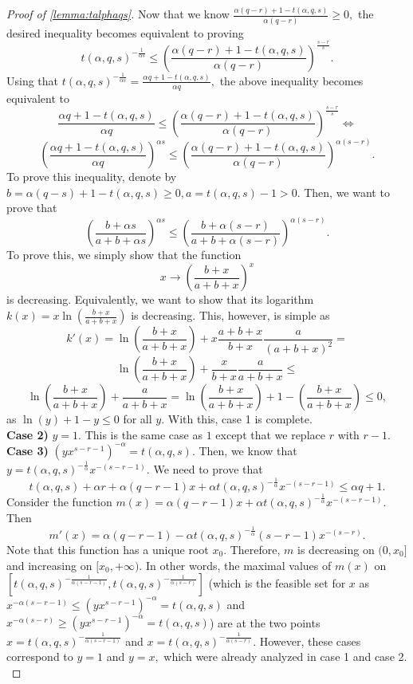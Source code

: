 \documentclass[11pt]{article}%
\numberwithin{theorem}{subsection}
\begin{document}
\begin{proof}[Proof of \cref{lemma:talphaqs}]
\noindent
Now that we know $\frac{\alpha (q-r)+1 - t(\alpha,q,s)}{\alpha (q-r)}\ge 0,$ the desired inequality becomes equivalent to proving 
$$
t(\alpha,q,s)^{-\frac{1}{\alpha s}}
\le \left(\frac{\alpha (q-r)+1 - t(\alpha,q,s)}{\alpha (q-r)}\right)^\frac{s-r}{s}.
$$
Using that $t(\alpha,q,s)^{-\frac{1}{\alpha s}} = \frac{\alpha q + 1 - t(\alpha,q,s)}{\alpha q},$ the above inequality becomes equivalent to 
$$
\frac{\alpha q + 1 - t(\alpha,q,s)}{\alpha q}\le 
 \left(\frac{\alpha (q-r)+1 - t(\alpha,q,s)}{\alpha (q-r)}\right)^\frac{s-r}{s} \Longleftrightarrow
$$
$$
\left(
\frac{\alpha q + 1 - t(\alpha,q,s)}{\alpha q}
\right)^{\alpha s}\le 
 \left(\frac{\alpha (q-r)+1 - t(\alpha,q,s)}{\alpha (q-r)}\right)^{\alpha (s-r)}.
$$
To prove this inequality, denote by $b = \alpha(q-s)+1- t(\alpha,q,s)\ge 0, a = t(\alpha,q,s) - 1> 0.$ Then, we want to prove that 
$$
\left(
\frac{b + \alpha s}{a + b + \alpha s}
\right)^{\alpha s}\le 
\left(
\frac{b + \alpha (s-r)}{a + b + \alpha (s-r)}
\right)^{\alpha (s-r)}.
$$
To prove this, we simply show that the function $$
x\longrightarrow
\left(
\frac{b + x}{a + b + x}
\right)^{x}
$$
is decreasing. Equivalently, we want to show that its logarithm $k(x)  = x\ln \left(
\frac{b + x}{a + b + x}
\right)$ is decreasing. This, however, is simple as 
$$
k'(x) = 
\ln \left(
\frac{b + x}{a + b + x}
\right) + 
x \frac{a+b+x}{b+x}\frac{a}{(a+b+x)^2} = 
$$
$$
\ln \left(
\frac{b + x}{a + b + x}
\right) + 
\frac{x}{b+x}\frac{a}{a+b+x}\le 
$$
$$
\ln \left(
\frac{b + x}{a + b + x}
\right) + 
\frac{a}{a+b+x} = 
\ln \left(
\frac{b + x}{a + b + x}
\right) + 1 - 
\left(
\frac{b + x}{a + b + x}
\right)\le 0,
$$
as $\ln (y) + 1 - y\le 0 $ for all $y.$ With this, case 1 is complete.\\
\textbf{Case 2)} $y = 1.$ This is the same case as $1$ except that we replace $r$ with $r-1.$\\
\textbf{Case 3)} $(yx^{s-r-1})^{-\alpha} = t(\alpha, q, s).$ Then, we know that $y = t(\alpha, q, s)^{-\frac{1}{\alpha}}x^{-(s-r-1)}.$ We need to prove that 
$$
t(\alpha, q, s) + \alpha r + \alpha (q-r-1)x + \alpha t(\alpha, q, s)^{-\frac{1}{\alpha}}x^{-(s-r-1)}\le 
\alpha q + 1.
$$
Consider the function $m(x) = \alpha (q-r-1)x + \alpha t(\alpha, q, s)^{-\frac{1}{\alpha}}x^{-(s-r-1)}.$ Then
$$
m'(x) = 
\alpha (q-r-1) - 
\alpha t(\alpha, q, s)^{-\frac{1}{\alpha}}(s-r-1)x^{-(s-r)}.
$$
Note that this function has a unique root
$x_0.$ Therefore, $m$ is decreasing on $(0,x_0]$ and increasing on $[x_0, +\infty).$ In other words, the maximal values of $m(x)$ on $[t(\alpha,q,s)^{-\frac{1}{\alpha(s-r-1)}},t(\alpha,q,s)^{-\frac{1}{\alpha(s-r)}}]$ (which is the feasible set for $x$ as $x^{-\alpha(s-r-1)}\le (yx^{s-r-1})^{-\alpha}  = t(\alpha,q,s)$ and\linebreak $x^{-\alpha(s-r)}\ge (yx^{s-r-1})^{-\alpha}  = t(\alpha,q,s)$)
 are at the two points $x = t(\alpha,q,s)^{-\frac{1}{\alpha(s-r-1)}}$ and \linebreak $x = t(\alpha,q,s)^{-\frac{1}{\alpha(s-r)}}.$ However, these cases correspond to $y = 1$ and $y = x,$ which were already analyzed in case 1 and case 2.\\
 

\end{proof}
\end{document}
